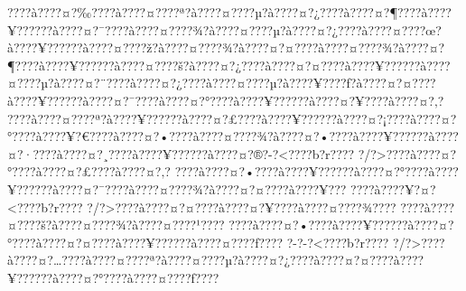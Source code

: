 \documentclass[11pt, openany]{book}
\begin{document}
{{{{{{{{{{{{{{{{{{{{{{{{{{{{{{{{{{{{{{{{{{{{{{{{{{{{{{{{{{{{{{{{{{{{{{{{{{{{{{{{{{{{{{{{{{{{{{{{{{{{{{{{{{{{{???\textbar{}?à???\textbar{}?¤?‰???\textbar{}?à???\textbar{}?¤???\textbar{}?ª?à???\textbar{}?¤???\textbar{}?µ?à???\textbar{}?¤?¿???\textbar{}?à???\textbar{}?¤?¶???\textbar{}?à???\textbar{}?¥?????\textbar{}?à???\textbar{}?¤?¯???\textbar{}?à???\textbar{}?¤???\textbar{}?¾?à???\textbar{}?¤???\textbar{}?µ?à???\textbar{}?¤?¿???\textbar{}?à???\textbar{}?¤???\textbar{}?œ?à???\textbar{}?¥?????\textbar{}?à???\textbar{}?¤???\textbar{}?ž?à???\textbar{}?¤???\textbar{}?¾?à???\textbar{}?¤?¤???\textbar{}?à???\textbar{}?¤???\textbar{}?¾?à???\textbar{}?¤?¶???\textbar{}?à???\textbar{}?¥?????\textbar{}?à???\textbar{}?¤???\textbar{}?š?à???\textbar{}?¤?¿???\textbar{}?à???\textbar{}?¤?¤???\textbar{}?à???\textbar{}?¥?????\textbar{}?à???\textbar{}?¤???\textbar{}?µ?à???\textbar{}?¤?¨???\textbar{}?à???\textbar{}?¤?¿???\textbar{}?à???\textbar{}?¤???\textbar{}?µ?à???\textbar{}?¥???\textbar{}?ƒ?à???\textbar{}?¤?¤???\textbar{}?à???\textbar{}?¥?????\textbar{}?à???\textbar{}?¤?¯???\textbar{}?à???\textbar{}?¤?°???\textbar{}?à???\textbar{}?¥?????\textbar{}?à???\textbar{}?¤?¥???\textbar{}?à???\textbar{}?¤?‚?
???\textbar{}?à???\textbar{}?¤???\textbar{}?ª?à???\textbar{}?¥?????\textbar{}?à???\textbar{}?¤?£???\textbar{}?à???\textbar{}?¥?????\textbar{}?à???\textbar{}?¤?¡???\textbar{}?à???\textbar{}?¤?°???\textbar{}?à???\textbar{}?¥?€???\textbar{}?à???\textbar{}?¤?•???\textbar{}?à???\textbar{}?¤???\textbar{}?¾?à???\textbar{}?¤?•???\textbar{}?à???\textbar{}?¥?????\textbar{}?à???\textbar{}?¤?·???\textbar{}?à???\textbar{}?¤?¸???\textbar{}?à???\textbar{}?¥?????\textbar{}?à???\textbar{}?¤?®?-?\textless{}???\textbar{}?b?r???\textbar{}?
?/?\textgreater{}???\textbar{}?à???\textbar{}?¤?°???\textbar{}?à???\textbar{}?¤?£???\textbar{}?à???\textbar{}?¤?‚?
???\textbar{}?à???\textbar{}?¤?•???\textbar{}?à???\textbar{}?¥?????\textbar{}?à???\textbar{}?¤?°???\textbar{}?à???\textbar{}?¥?????\textbar{}?à???\textbar{}?¤?¯???\textbar{}?à???\textbar{}?¤???\textbar{}?¾?à???\textbar{}?¤?¤???\textbar{}?à???\textbar{}?¥???
???\textbar{}?à???\textbar{}?¥?¤?\textless{}???\textbar{}?b?r???\textbar{}?
?/?\textgreater{}???\textbar{}?à???\textbar{}?¤?¤???\textbar{}?à???\textbar{}?¤?¥???\textbar{}?à???\textbar{}?¤???\textbar{}?¾???\textbar{}?
???\textbar{}?à???\textbar{}?¤???\textbar{}?š?à???\textbar{}?¤???\textbar{}?¾?à???\textbar{}?¤???\textbar{}?¹???\textbar{}?
???\textbar{}?à???\textbar{}?¤?•???\textbar{}?à???\textbar{}?¥?????\textbar{}?à???\textbar{}?¤?°???\textbar{}?à???\textbar{}?¤?¤???\textbar{}?à???\textbar{}?¥?????\textbar{}?à???\textbar{}?¤???\textbar{}?ƒ???\textbar{}?
?-?-?\textless{}???\textbar{}?b?r???\textbar{}?
?/?\textgreater{}???\textbar{}?à???\textbar{}?¤?\ldots{}???\textbar{}?à???\textbar{}?¤???\textbar{}?ª?à???\textbar{}?¤???\textbar{}?µ?à???\textbar{}?¤?¿???\textbar{}?à???\textbar{}?¤?¤???\textbar{}?à???\textbar{}?¥?????\textbar{}?à???\textbar{}?¤?°???\textbar{}?à???\textbar{}?¤???\textbar{}?ƒ???\textbar{}?
}}}}}}}}}}}}}}}}}}}}}}}}}}}}}}}}}}}}}}}}}}}}}}}}}}}}}}}}}}}}}}}}}}}}}}}}}}}}}}}}}}}}}}}}}}}}}}}}}}}}}}}}}}}}}
\end{document}
